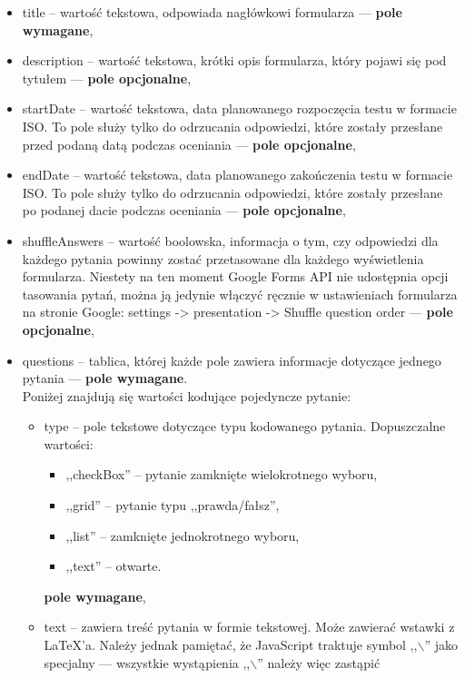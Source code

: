 \begin{itemize}
  \item{title} -- wartość tekstowa, odpowiada nagłówkowi formularza --- 
  \textbf{pole wymagane},
  \item{description} -- wartość tekstowa, krótki opis formularza, który
  pojawi się pod tytułem ---  \textbf{pole opcjonalne},
  \item{startDate} -- wartość tekstowa, data planowanego rozpoczęcia testu
  w formacie ISO. To pole służy tylko do odrzucania odpowiedzi, które zostały
  przesłane przed podaną datą podczas oceniania ---  \textbf{pole opcjonalne},
  \item{endDate} -- wartość tekstowa, data planowanego zakończenia testu
  w formacie ISO. To pole służy tylko do odrzucania odpowiedzi, które zostały
  przesłane po podanej dacie podczas oceniania ---  \textbf{pole opcjonalne},
  \item{shuffleAnswers} -- wartość boolowska, informacja o tym, czy odpowiedzi
  dla każdego pytania powinny zostać przetasowane dla każdego wyświetlenia
  formularza. Niestety na ten moment Google Forms API nie udostępnia opcji
  tasowania pytań, można ją jedynie włączyć ręcznie w ustawieniach formularza
  na stronie Google: settings -> presentation -> Shuffle question order
  ---  \textbf{pole opcjonalne},
  \item{questions} -- tablica, której każde pole zawiera informacje dotyczące
  jednego pytania --- \textbf{pole wymagane}. \\Poniżej znajdują się wartości
  kodujące pojedyncze pytanie:
  \begin{itemize}
    \item{type} -- pole tekstowe dotyczące typu kodowanego pytania.
    Dopuszczalne wartości:
    \begin{itemize}
      \item ,,checkBox'' -- pytanie zamknięte wielokrotnego wyboru,
      \item ,,grid'' -- pytanie typu ,,prawda/fałsz'',
      \item ,,list'' -- zamknięte jednokrotnego wyboru,
      \item ,,text'' -- otwarte.
    \end{itemize}
    \textbf{pole wymagane},
    \item{text} -- zawiera treść pytania w formie tekstowej. Może zawierać wstawki
    z \LaTeX{}'a. Należy jednak pamiętać, że JavaScript traktuje symbol ,,$\backslash$''
    jako specjalny --- wszystkie wystąpienia ,,$\backslash$'' należy więc zastąpić

\end{itemize}
\end{itemize}
